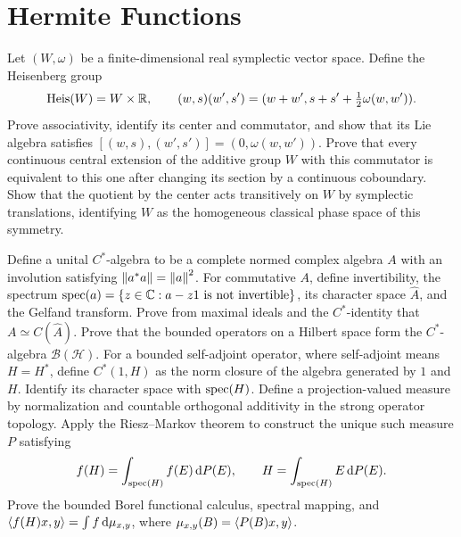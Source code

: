 \section{Hermite Functions}

\begin{exercise}
Let $(W,\omega)$ be a finite-dimensional real symplectic vector space.
Define the Heisenberg group
\[
 \operatorname{Heis}(W)=W\times\mathbb R,
 \qquad (w,s)(w',s')=(w+w',s+s'+\tfrac12\omega(w,w')).
\]
Prove associativity, identify its center and commutator, and show that its Lie
algebra satisfies $[(w,s),(w',s')]=(0,\omega(w,w'))$.  Prove that every
continuous central extension of the additive group $W$ with this commutator
is equivalent to this one after changing its section by a continuous
coboundary.  Show that the quotient by the center acts transitively on $W$ by
symplectic translations, identifying $W$ as the homogeneous classical phase
space of this symmetry.
\end{exercise}

\begin{exercise}
Define a unital $C^*$-algebra to be a complete normed complex algebra $A$
with an involution satisfying $\left\lVert a^*a\right\rVert=\left\lVert a\right\rVert^2$.  For commutative $A$,
define invertibility, the spectrum
$\operatorname{spec}(a)=\{z\in\mathbb C:a-z1\text{ is not invertible}\}$, its character space
$\widehat A$, and the Gelfand transform.  Prove from
maximal ideals and the $C^*$-identity that
$A\simeq C(\widehat A)$.  Prove that the bounded operators on a Hilbert space
form the $C^*$-algebra $\mathcal B(\mathcal H)$.  For a bounded self-adjoint
operator, where self-adjoint means $H=H^*$, define $C^*(1,H)$ as the norm
closure of the algebra generated by $1$ and $H$.
Identify its character space with $\operatorname{spec}(H)$.  Define a projection-valued
measure by normalization and countable orthogonal additivity in the strong
operator topology.  Apply the Riesz--Markov theorem to construct the unique
such measure $P$ satisfying
\[
 f(H)=\int_{\operatorname{spec}(H)}f(E)\,\mathrm d P(E),\qquad
 H=\int_{\operatorname{spec}(H)}E\,\mathrm d P(E).
\]
Prove the bounded Borel functional calculus, spectral mapping, and
$\left\langle f(H)x,y\right\rangle=\int f\,\mathrm d\mu_{x,y}$, where
$\mu_{x,y}(B)=\left\langle P(B)x,y\right\rangle$.
\end{exercise}

